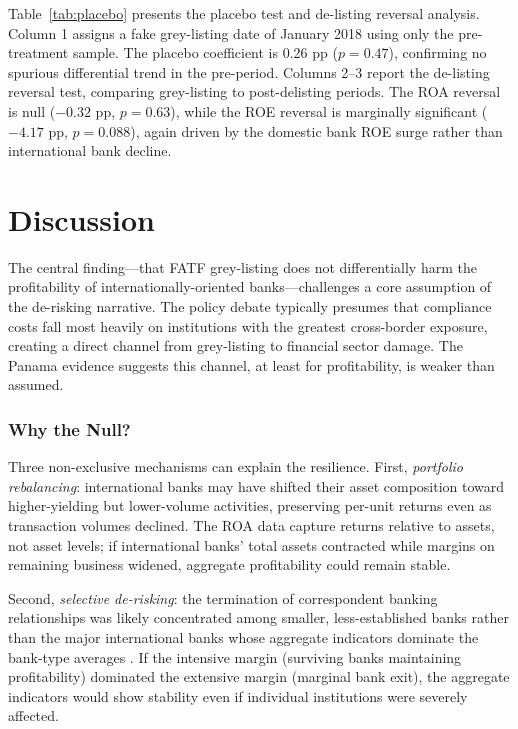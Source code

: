 \documentclass[12pt]{article}
\begin{document}


Table~\ref{tab:placebo} presents the placebo test and de-listing reversal analysis. Column 1 assigns a fake grey-listing date of January 2018 using only the pre-treatment sample. The placebo coefficient is 0.26 pp ($p = 0.47$), confirming no spurious differential trend in the pre-period. Columns 2--3 report the de-listing reversal test, comparing grey-listing to post-delisting periods. The ROA reversal is null ($-0.32$ pp, $p = 0.63$), while the ROE reversal is marginally significant ($-4.17$ pp, $p = 0.088$), again driven by the domestic bank ROE surge rather than international bank decline.


\section{Discussion}

The central finding---that FATF grey-listing does not differentially harm the profitability of internationally-oriented banks---challenges a core assumption of the de-risking narrative. The policy debate typically presumes that compliance costs fall most heavily on institutions with the greatest cross-border exposure, creating a direct channel from grey-listing to financial sector damage. The Panama evidence suggests this channel, at least for profitability, is weaker than assumed.

\subsubsection*{Why the Null?}
Three non-exclusive mechanisms can explain the resilience. First, \textit{portfolio rebalancing}: international banks may have shifted their asset composition toward higher-yielding but lower-volume activities, preserving per-unit returns even as transaction volumes declined. The ROA data capture returns relative to assets, not asset levels; if international banks' total assets contracted while margins on remaining business widened, aggregate profitability could remain stable.

Second, \textit{selective de-risking}: the termination of correspondent banking relationships was likely concentrated among smaller, less-established banks rather than the major international banks whose aggregate indicators dominate the bank-type averages \citep{erbenova2016}. If the intensive margin (surviving banks maintaining profitability) dominated the extensive margin (marginal bank exit), the aggregate indicators would show stability even if individual institutions were severely affected.
\end{document}
